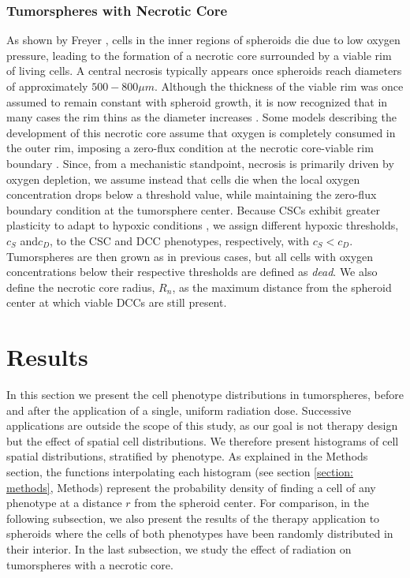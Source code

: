 \documentclass[10pt,letterpaper]{article}
\begin{document}
\subsubsection*{Tumorspheres with Necrotic Core}
As shown by Freyer \cite{freyer1986}, cells in the inner regions of spheroids die due to low oxygen pressure, leading to the formation of a necrotic core surrounded by a viable rim of living cells. A central necrosis typically appears once spheroids reach diameters of approximately $500-800 \mu m$. Although the thickness of the viable rim was once assumed to remain constant with spheroid growth, it is now recognized that in many cases the rim thins as the diameter increases \cite{Groebe1996}. Some models describing the development of this necrotic core assume that oxygen is completely consumed in the outer rim, imposing a zero-flux condition at the necrotic core-viable rim boundary \cite{Burton1966, grimes2014method}. Since, from a mechanistic standpoint, necrosis is primarily driven by oxygen depletion, we assume instead that cells die when the local oxygen concentration drops below a threshold value, while maintaining the zero-flux boundary condition at the tumorsphere center. Because CSCs exhibit greater plasticity to adapt to hypoxic conditions \cite{ mimeault2013, iriondo2015, carnero2016, papale2020}, we assign different hypoxic thresholds, $c_S$ and$c_D$, to the CSC and DCC phenotypes, respectively, with $c_S<c_D$. Tumorspheres are then grown as in previous cases, but all cells with oxygen concentrations below their respective thresholds are defined as \emph{dead}. We also define the necrotic core radius, $R_n$, as the maximum distance from the spheroid center at which viable DCCs are still present.


\section*{Results}

In this section we present the cell phenotype distributions in tumorspheres, before and after the application of a single, uniform radiation dose. Successive applications are outside the scope of this study, as our goal is not therapy design but the effect of spatial cell distributions. We therefore present histograms of cell spatial distributions, stratified by phenotype.  As explained in the Methods section, the functions interpolating each histogram (see section \ref{section: methods}, Methods) represent the probability density of finding a cell of any phenotype at a distance $r$ from the spheroid center. For comparison, in the following subsection, we also present the results of the therapy application to spheroids where the cells of both phenotypes have been randomly distributed in their interior. In the last subsection, we study the effect of radiation on tumorspheres with a necrotic core.
\end{document}
